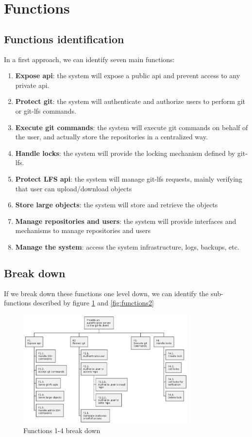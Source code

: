 \newpage
\section{Functions}

\subsection{Functions identification}

In a first approach, we can identify seven main functions:

\begin{enumerate}
    \item \textbf{Expose api}: the system will expose a public api and prevent access to any private api.
    \item \textbf{Protect git}: the system will authenticate and authorize users to perform git or git-lfs commands.
    \item \textbf{Execute git commands}: the system will execute git commands on behalf of the user, and actually store the repositories in a centralized way.
    \item \textbf{Handle locks}: the system will provide the locking mechanism defined by git-lfs.
    \item \textbf{Protect LFS api}: the system will manage git-lfs requests, mainly verifying that user can upload/download objects
    \item \textbf{Store large objects}: the system will store and retrieve the objects
    \item \textbf{Manage repositories and users}: the system will provide interfaces and mechanisms to manage repositories and users
    \item \textbf{Manage the system}: access the system infrastructure, logs, backups, etc.
\end{enumerate}

\subsection{Break down}

If we break down these functions one level down, we can identify the sub-functions described by figure \ref{fig:functions} and \ref{fig:functions2}

\begin{figure}[H]
    \centering
    \includegraphics[width=0.8\textwidth]{design/diagrams/functions.png}
    \caption{Functions 1-4 break down}
    \label{fig:functions}
\end{figure}


